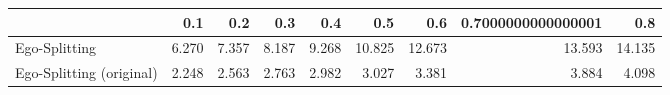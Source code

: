 \begin{tabular}{lrrrrrrrr}
\toprule
{} &   0.1 &   0.2 &   0.3 &   0.4 &    0.5 &    0.6 & 0.7000000000000001 &    0.8 \\
\midrule
Ego-Splitting            & 6.270 & 7.357 & 8.187 & 9.268 & 10.825 & 12.673 &             13.593 & 14.135 \\
Ego-Splitting (original) & 2.248 & 2.563 & 2.763 & 2.982 &  3.027 &  3.381 &              3.884 &  4.098 \\
\bottomrule
\end{tabular}
